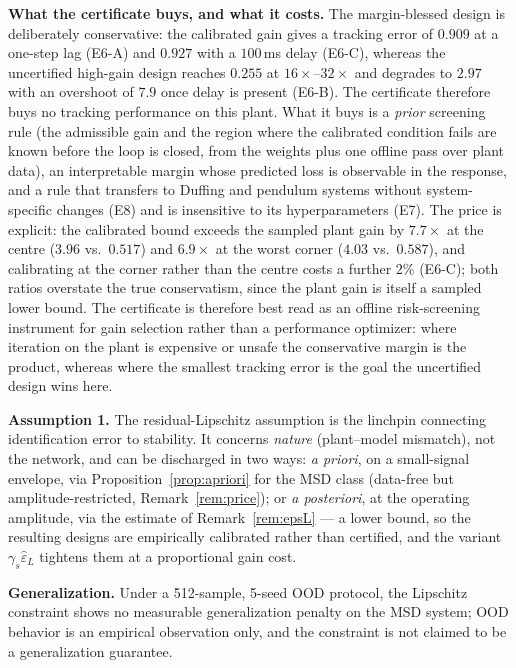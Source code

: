 \documentclass[11pt]{article}
\newcommand{\epsL}{\varepsilon_L}
\begin{document}
\textbf{What the certificate buys, and what it costs.} The margin-blessed
design is deliberately conservative: the calibrated gain gives a tracking
error of $0.909$ at a one-step lag (E6-A) and $0.927$ with a $100$\,ms delay
(E6-C), whereas the uncertified high-gain design reaches $0.255$ at
$16\times$--$32\times$ and degrades to $2.97$ with an overshoot of $7.9$ once
delay is present (E6-B). The certificate therefore buys no tracking
performance on this plant. What it buys is a \emph{prior} screening rule (the
admissible gain and the region where the calibrated condition fails are known
before the loop is closed, from the weights plus one offline pass over plant
data), an interpretable margin whose predicted loss is observable in the
response, and a rule that transfers to Duffing and pendulum systems without
system-specific changes (E8) and is insensitive to its hyperparameters (E7).
The price is explicit: the calibrated bound exceeds the sampled plant gain by
$7.7\times$ at the centre ($3.96$ vs.\ $0.517$) and $6.9\times$ at the worst
corner ($4.03$ vs.\ $0.587$), and calibrating at the corner rather than the centre costs a further
$2\%$ (E6-C); both ratios overstate the true conservatism, since the plant
gain is itself a sampled lower bound. The certificate is therefore best read
as an offline risk-screening instrument for gain selection rather than a
performance optimizer: where iteration on the plant is expensive or unsafe the
conservative margin is the product, whereas where the smallest tracking error
is the goal the uncertified design wins here.

\textbf{Assumption 1.} The residual-Lipschitz assumption is the linchpin
connecting identification error to stability. It concerns \emph{nature}
(plant--model mismatch), not the network, and can be discharged in two ways:
\emph{a priori}, on a small-signal envelope, via
Proposition~\ref{prop:apriori} for the MSD class (data-free but
amplitude-restricted, Remark~\ref{rem:price}); or \emph{a posteriori}, at the
operating amplitude, via the estimate of Remark~\ref{rem:epsL} --- a lower
bound, so the resulting designs are empirically calibrated rather than
certified, and the variant $\gamma_s\hat\epsL$ tightens them at a
proportional gain cost.

\textbf{Generalization.} Under a 512-sample, 5-seed OOD protocol, the
Lipschitz constraint shows no measurable generalization penalty on the MSD
system; OOD behavior is an empirical observation only, and the constraint is not
claimed to be a generalization guarantee.
\end{document}
